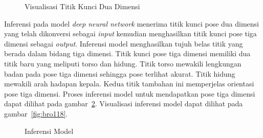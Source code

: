 \begin{figure}[htbp]
    \begin{center}
    \end{center}
    \vspace{-20pt}
    \captionsetup{labelfont=bf, textfont=bf}
    \caption{Visualisasi Titik Kunci Dua Dimensi}
    \vspace{-10pt}
    \captionsetup{labelfont=md, textfont=md}
    \label{fig:konversi_keypoint}
\end{figure}

Inferensi pada model \textit{deep neural network} menerima titik kunci pose dua dimensi yang telah
dikonversi sebagai \textit{input} kemudian menghasilkan titik kunci pose tiga dimensi sebagai \textit{output}.
Inferensi model menghasilkan tujuh belas titik yang berada dalam bidang tiga dimensi.
Titik kunci pose tiga dimensi memiliki dua titik baru yang meliputi torso dan hidung. Titik torso
mewakili lengkungan badan pada pose tiga dimensi sehingga pose terlihat akurat. Titik hidung
mewakili arah hadapan kepala. Kedua titik tambahan ini memperjelas orientasi pose tiga dimensi.
Proses inferensi model untuk mendapatkan pose tiga dimensi dapat
dilihat pada gambar~\ref{fig:inferensi}. Visualisasi inferensi model dapat dilihat pada gambar~\ref{fig:bro118}.

\begin{figure}[htbp]
    \begin{center}
    \end{center}
    \vspace{-20pt}
    \captionsetup{labelfont=bf, textfont=bf}
    \caption{Inferensi Model}
    \vspace{-10pt}
    \captionsetup{labelfont=md, textfont=md}
    \label{fig:inferensi}
\end{figure}

